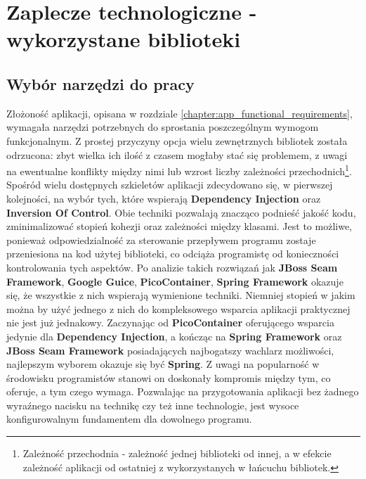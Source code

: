 \chapter{Zaplecze technologiczne - wykorzystane biblioteki}
\label{chapter:libs}

\section{Wybór narzędzi do pracy}
	Złożoność aplikacji, opisana w rozdziale \ref{chapter:app_functional_requirements}, wymagała narzędzi potrzebnych do sprostania poszczególnym wymogom funkcjonalnym. Z prostej przyczyny opcja wielu zewnętrznych bibliotek została odrzucona: zbyt wielka ich ilość z czasem mogłaby stać się problemem, z uwagi na ewentualne konflikty między nimi lub wzrost liczby zależności przechodnich\footnote{Zależność przechodnia - zależność jednej biblioteki od innej, a w efekcie zależność aplikacji od ostatniej z wykorzystanych w łańcuchu bibliotek.}. Spośród wielu dostępnych szkieletów aplikacji zdecydowano się, w pierwszej kolejności, na wybór tych, które wspierają \textbf{Dependency Injection} oraz \textbf{Inversion Of Control}. Obie techniki pozwalają znacząco podnieść jakość kodu, zminimalizować stopień kohezji oraz zależności między klasami. Jest to możliwe, ponieważ odpowiedzialność za sterowanie przepływem programu zostaje przeniesiona na kod użytej biblioteki, co odciąża programistę od konieczności kontrolowania tych aspektów. Po analizie takich rozwiązań jak \textbf{JBoss Seam Framework}, \textbf{Google Guice}, \textbf{PicoContainer}, \textbf{Spring Framework} okazuje się, że wszystkie z nich wspierają wymienione techniki. Niemniej stopień w jakim można by użyć jednego z nich do kompleksowego wsparcia aplikacji praktycznej nie jest już jednakowy. Zaczynając od \textbf{PicoContainer} oferującego wsparcia jedynie dla \textbf{Dependency Injection}, a kończąc na \textbf{Spring Framework} oraz \textbf{JBoss Seam Framework} posiadających najbogatszy wachlarz możliwości, najlepszym wyborem okazuje się być \textbf{Spring}. Z uwagi na popularność w środowisku programistów stanowi on doskonały kompromis między tym, co oferuje, a tym czego wymaga. Pozwalając na przygotowania aplikacji bez żadnego wyraźnego nacisku na technikę czy też inne technologie, jest wysoce konfigurowalnym fundamentem dla dowolnego programu. 
	
